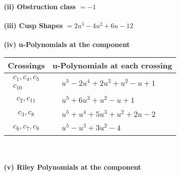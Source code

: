 \documentclass[1p]{elsarticle_modified}
\theoremstyle{definition}
\begin{document}
\flushleft \textbf{(ii) Obstruction class $= -1$}\\~\\
\flushleft \textbf{(iii) Cusp Shapes $= 2 u^3-4 u^2+6 u-12$}\\~\\
\newpage\renewcommand{\arraystretch}{1}
\flushleft \textbf{(iv) u-Polynomials at the component}\newline \\
\begin{tabular}{m{50pt}|m{274pt}}
Crossings & \hspace{64pt}u-Polynomials at each crossing \\
\hline $$\begin{aligned}c_{1},c_{4},c_{5}\\c_{10}\end{aligned}$$&$\begin{aligned}
&u^5-2 u^4+2 u^3+u^2- u+1
\end{aligned}$\\
\hline $$\begin{aligned}c_{2},c_{11}\end{aligned}$$&$\begin{aligned}
&u^5+6 u^3+u^2- u+1
\end{aligned}$\\
\hline $$\begin{aligned}c_{3},c_{8}\end{aligned}$$&$\begin{aligned}
&u^5+u^4+5 u^3+u^2+2 u-2
\end{aligned}$\\
\hline $$\begin{aligned}c_{6},c_{7},c_{9}\end{aligned}$$&$\begin{aligned}
&u^5- u^3+3 u^2-4
\end{aligned}$\\
\hline
\end{tabular}\\~\\
\newpage\renewcommand{\arraystretch}{1}
\flushleft \textbf{(v) Riley Polynomials at the component}\newline \\
\end{document}
